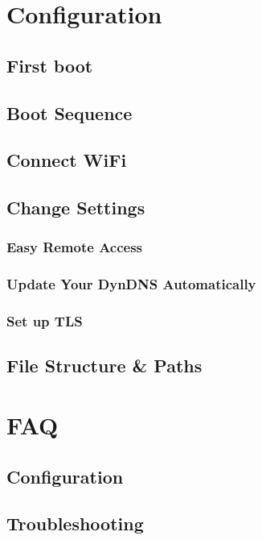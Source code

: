 \documentclass{article}
\begin{document}
\section{Configuration}
\subsection{First boot}

\subsection{Boot Sequence}

\subsection{Connect WiFi}

\subsection{Change Settings}
\subsubsection{Easy Remote Access}

\subsubsection{Update Your DynDNS Automatically}

\subsubsection{Set up TLS} \label{Set up TLS}


\subsection{File Structure \& Paths}



\section{FAQ}
\subsection{Configuration}


\subsection{Troubleshooting}

\end{document}
